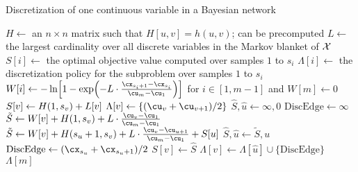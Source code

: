 \begin{algorithm}
  \caption{Discretization of one continuous variable in a Bayesian network}
  \label{alg:disc_one}
  \begin{algorithmic}[5]
      \State $H \leftarrow$ an $n \times n$ matrix such that $H[u,v] = h(u,v)$; can be precomputed
      \State $L \leftarrow$ the largest cardinality over all discrete variables in the Markov blanket of $\mathcal{X}$
      \State $S[i] \leftarrow$ the optimal objective value computed over samples $1$ to $s_i$
      \State $\Lambda[i] \leftarrow$ the discretization policy for the subproblem over samples $1$ to $s_i$
      \State $W[i]  \leftarrow - \ln\brock{1 - {\exp\paren{- L \cdot{ {{\cx_{s_i+1} - \cx_{s_i}}\over{\cu_m - \cu_1}}}}}}$ for $i \in [1,m-1]$ and $W[m] \leftarrow 0$
          \State $S[v] \leftarrow H \paren{1,s_v} + L[v]$
          \State $\Lambda[v] \leftarrow \curly{({\cu_v + \cu_{v+1}}) / 2}$
        \Else
          \State $\hat{S}, \hat{u} \leftarrow \infty, 0$
          \State $\text{DiscEdge} \leftarrow \infty$
              \State $\tilde{S} \leftarrow W[v] + H \paren{1, s_v} +  {L \cdot {\frac{\cu_{v} - \cu_1}{\cu_m - \cu_1}}}$
            \Else
              \State $\tilde{S} \leftarrow W[v] + H \paren{s_u+1, s_v} +  {L \cdot {\frac{\cu_{v} - \cu_{u + 1}}{\cu_m - \cu_1}}} + S[u]$
            \EndIf
              \State $\hat{S}, \hat{u} \leftarrow \tilde{S}, u$
              \State $\text{DiscEdge} \leftarrow ({\cx_{s_u} + \cx_{s_u+1}}) / 2$
            \EndIf
          \EndFor
          \State $S[v] \leftarrow \hat{S}$
          \State $\Lambda[v] \leftarrow \Lambda[\hat{u}] \cup \{ \text{DiscEdge} \}$
        \EndIf
      \EndFor
      \State \Return $\Lambda[m]$
    \EndFunction
  \end{algorithmic}
\end{algorithm}


